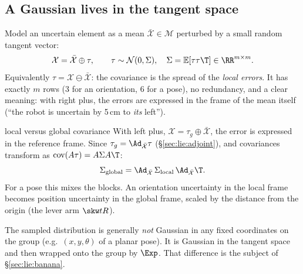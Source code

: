 \subsection{A Gaussian lives in the tangent space}\label{sec:lie:covariance}

Model an uncertain element as a mean $\bar{\mathcal X}\in\mathcal M$ perturbed by a small random tangent vector:
\[
\mathcal X=\bar{\mathcal X}\oplus\tau,\qquad\tau\sim\mathcal N(0,\Sigma),\quad\Sigma=\mathbb E[\tau\tau\T]\in\RR^{m\times m}.
\]
Equivalently $\tau=\mathcal X\ominus\bar{\mathcal X}$: the covariance is the spread of the \emph{local errors}. It has exactly $m$ rows (3 for an orientation, 6 for a pose), no redundancy, and a clear meaning: with right plus, the errors are expressed in the frame of the mean itself (``the robot is uncertain by 5\,cm to \emph{its} left'').

\begin{deriv}{local versus global covariance}
With left plus, $\mathcal X=\tau_g\oplus\bar{\mathcal X}$, the error is expressed in the reference frame. Since $\tau_g=\Ad_{\bar{\mathcal X}}\tau$ (\S\ref{sec:lie:adjoint}), and covariances transform as $\mathrm{cov}(A\tau)=A\Sigma A\T$:
\[
\Sigma_{\text{global}}=\Ad_{\bar{\mathcal X}}\,\Sigma_{\text{local}}\,\Ad_{\bar{\mathcal X}}\T .
\]
For a pose this mixes the blocks. An orientation uncertainty in the local frame becomes position uncertainty in the global frame, scaled by the distance from the origin (the lever arm $\skw tR$).
\end{deriv}

The sampled distribution is generally \emph{not} Gaussian in any fixed coordinates on the group (e.g.\ $(x,y,\theta)$ of a planar pose). It is Gaussian in the tangent space and then wrapped onto the group by $\Exp$. That difference is the subject of \S\ref{sec:lie:banana}.
